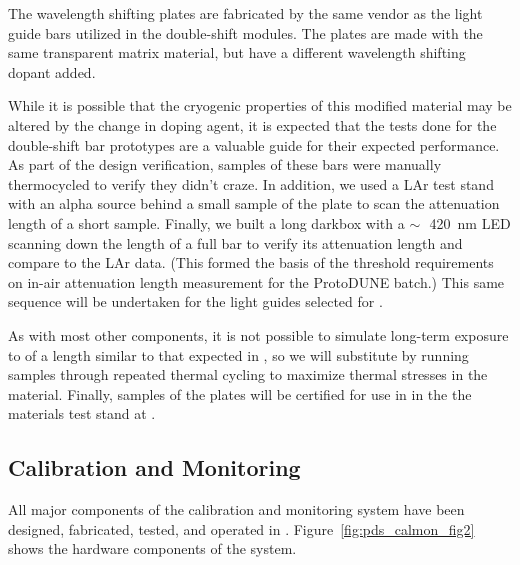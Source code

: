 The  wavelength shifting plates are fabricated by the same vendor as the light guide bars utilized in the double-shift  modules.  The plates are made with the same transparent matrix material, but have a different wavelength shifting dopant added.  

While it is possible that the cryogenic properties of this modified  material may be altered by the change in doping agent, it is expected that the tests done for the double-shift bar prototypes are a valuable guide for their expected performance.  As part of the design verification, samples of these bars were manually thermocycled to verify they didn't craze. In addition, we used 
a LAr test stand 
with an alpha source behind a small sample of the  plate to scan the attenuation length of a short sample. Finally, we built a long darkbox with a $\sim\,$~\SI{420}{nm} LED scanning down the length of a full bar to verify its attenuation length and compare to the LAr data. (This formed the basis of the threshold requirements on in-air attenuation length measurement for the ProtoDUNE batch.) 
This same sequence will be undertaken for the light guides selected for . 

As with most other components, it is not possible to simulate long-term exposure to  of a length similar to that expected in , so we will substitute by running samples through repeated thermal cycling to maximize thermal stresses in the material.  Finally, samples of the  plates will be certified for use in  in the the materials test stand at .  



\subsection{Calibration and Monitoring}
\label{sec:fdsp-pd-validation-candm}


All major components of the   calibration and monitoring system have been designed, fabricated, tested, and operated in .
Figure~\ref{fig:pds_calmon_fig2} shows the hardware components of the system.

